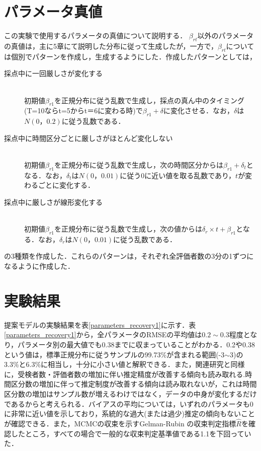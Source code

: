 \documentclass[a4paper,11pt,oneside,openany]{jsbook}
\begin{document}
\section{パラメータ真値}
この実験で使用するパラメータの真値について説明する．
$\beta_{rt}$以外のパラメータの真値は，主に5章にて説明した分布に従って生成したが，一方で，$\beta_{rt}$については個別でパターンを作成し，生成するようにした．作成したパターンとしては，
\begin{description}
\item [採点中に一回厳しさが変化する]\mbox{}\\
初期値$\beta_{r1}$を正規分布に従う乱数で生成し，採点の真ん中のタイミング(T=10ならt=5からt＝6に変わる時)で$\beta_{r1}+\delta$に変化させる．なお，$\delta$は$N(0，0.2)$に従う乱数である．
\item [採点中に時間区分ごとに厳しさがほとんど変化しない]\mbox{}\\
初期値$\beta_{r1}$を正規分布に従う乱数で生成し，次の時間区分からは$\beta_{r1}+\delta_t$となる．なお，$\delta_t$は$N(0，0.01)$に従う0に近い値を取る乱数であり，$t$が変わるごとに変化する．
\item [採点中に厳しさが線形変化する]\mbox{}\\
初期値$\beta_{r1}$を正規分布に従う乱数で生成し，次の値からは$\delta_r \times t +\beta_{r1}$となる．なお，$\delta_r$は$N(0，0.01)$に従う乱数である．
\end{description}
の3種類を作成した．これらのパターンは，それぞれ全評価者数の3分の1ずつになるように作成した．
\section{実験結果}
提案モデルの実験結果を表\ref{parameters_recovery1}に示す．表\ref{parameters_recovery1}から，全パラメータのRMSEの平均値は$0.2\sim0.3$程度となり，パラメータ別の最大値でも0.38までに収まっていることがわかる．0.2や0.38という値は，標準正規分布に従うサンプルの99.73\%が含まれる範囲(-3$\sim$3)の3.3\%と6.3\%に相当し，十分に小さい値と解釈できる．また，関連研究と同様に，受検者数・評価者数の増加に伴い推定精度が改善する傾向も読み取れる.時間区分数の増加に伴って推定制度が改善する傾向は読み取れないが，これは時間区分数の増加はサンプル数が増えるわけではなく，データの中身が変化するだけであるからと考えられる．バイアスの平均については，いずれのパラメータも0に非常に近い値を示しており，系統的な過大(または過少)推定の傾向もないことが確認できる．また，MCMCの収束を示すGelman-Rubin の収束判定指標$ \hat{R} $\cite{RhatRubin,RhatCarlin}を確認したところ，すべての場合で一般的な収束判定基準値である1.1を下回っていた．
\end{document}
